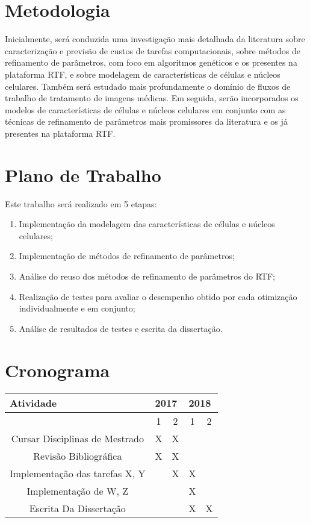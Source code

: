 \documentclass[a4paper,10pt]{article}
\begin{document}
\section{Metodologia}
Inicialmente, será conduzida uma investigação mais detalhada da literatura sobre caracterização e previsão de custos de tarefas computacionais, sobre métodos de refinamento de parâmetros, com foco em algoritmos genéticos e os presentes na plataforma RTF, e sobre modelagem de características de células e núcleos celulares. Também será estudado mais profundamente o domínio de fluxos de trabalho de tratamento de imagens médicas. Em seguida, serão incorporados os modelos de características de células e núcleos celulares em conjunto com as técnicas de refinamento de parâmetros mais promissores da literatura e os já presentes na plataforma RTF.

\section{Plano de Trabalho}

Este trabalho será realizado em 5 etapas:
\begin{enumerate}
	\item Implementação da modelagem das características de células e núcleos celulares;
	\item Implementação de métodos de refinamento de parâmetros;
	\item Análise do reuso dos métodos de refinamento de parâmetros do RTF;
	\item Realização de testes para avaliar o desempenho obtido por cada otimização individualmente e em conjunto;
	\item Análise de resultados de testes e escrita da dissertação.
\end{enumerate}


\section{Cronograma}
\begin{table}[!h]
	\centering
	\label{my-label}
	\begin{tabular}{|c|c|c|c|c|}
		\hline
		\multicolumn{1}{|l|}{Atividade} & \multicolumn{2}{l|}{2017} & \multicolumn{2}{l|}{2018} \\ \hline
		& 1\degree    & 2\degree    & 1\degree    & 2\degree    \\ \hline
		Cursar Disciplinas de Mestrado  & X           &  X           &             &             \\ \hline
		Revisão Bibliográfica           & X           & X           &             &             \\ \hline
		Implementação das tarefas X, Y  &             & X           & X           &             \\ \hline
		Implementação de W, Z     &             &             & X           &             \\ \hline
		Escrita Da Dissertação          &             &             & X           & X           \\ \hline
	\end{tabular}
\end{table}



	
	
	
\end{document}
